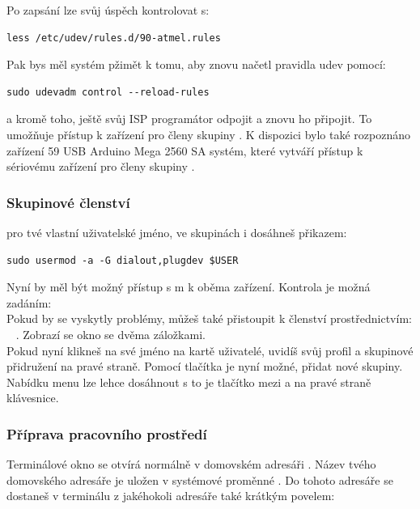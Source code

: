 Po zapsání lze svůj úspěch kontrolovat s:
\begin{footnotesize} \vspace{-0.4em} \begin{verbatim}
less /etc/udev/rules.d/90-atmel.rules
\end{verbatim} \end{footnotesize}
Pak bys měl systém pžimět k tomu, aby znovu načetl pravidla udev pomocí: 
\begin{footnotesize} \vspace{-0.4em} \begin{verbatim}
sudo udevadm control --reload-rules
\end{verbatim} \end{footnotesize}
a kromě toho, ještě svůj ISP programátor odpojit a znovu ho připojit. 
To umožňuje přístup k zařízení pro členy skupiny .
K dispozici bylo také rozpoznáno zařízení 59 USB Arduino Mega 2560 SA systém, které vytváří přístup
k sériovému zařízení  pro členy skupiny .
\vspace*{-0.3em} 
\subsubsection{Skupinové členství}
pro tvé vlastní uživatelské jméno, ve skupinách  i  dosáhneš přikazem:
\begin{large} \vspace{-0.4em} \begin{verbatim}
sudo usermod -a -G dialout,plugdev $USER
\end{verbatim} \end{large}
Nyní by měl být možný přístup s m k oběma zařízení.
Kontrola je možná zadáním:
\\
Pokud by se vyskytly problémy, můžeš také přistoupit k členství prostřednictvím: \\
~ . Zobrazí se okno se dvěma záložkami. \\
Pokud nyní klikneš na své jméno na kartě uživatelé, uvidíš svůj profil a skupinové přidružení na pravé straně. Pomocí tlačítka  je nyní možné, přidat nové skupiny.\\
Nabídku menu lze lehce dosáhnout s \keys{\winmenu} to je tlačítko mezi  a \keys{\AltGr} na pravé straně klávesnice.
\vspace*{-0.3em} 
\subsubsection{Příprava pracovního prostředí} 
Terminálové okno se otvírá normálně v domovském adresáři .
Název tvého domovského adresáře je uložen v systémové proměnné .
Do tohoto adresáře se dostaneš v terminálu z jakéhokoli adresáře také krátkým povelem:

